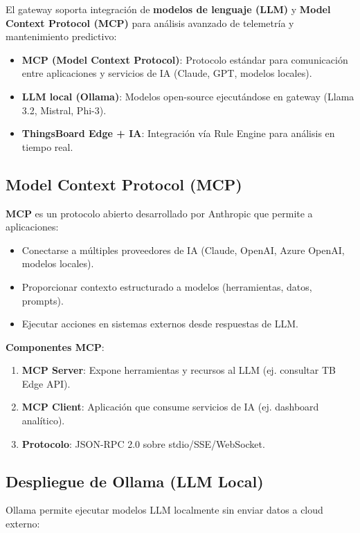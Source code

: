 El gateway soporta integración de \textbf{modelos de lenguaje (LLM)} y \textbf{Model Context Protocol (MCP)} para análisis avanzado de telemetría y mantenimiento predictivo:

\begin{itemize}
    \item \textbf{MCP (Model Context Protocol)}: Protocolo estándar para comunicación entre aplicaciones y servicios de IA (Claude, GPT, modelos locales).
    \item \textbf{LLM local (Ollama)}: Modelos open-source ejecutándose en gateway (Llama 3.2, Mistral, Phi-3).
    \item \textbf{ThingsBoard Edge + IA}: Integración vía Rule Engine para análisis en tiempo real.
\end{itemize}

\subsection{Model Context Protocol (MCP)}

\textbf{MCP} es un protocolo abierto desarrollado por Anthropic que permite a aplicaciones:
\begin{itemize}
    \item Conectarse a múltiples proveedores de IA (Claude, OpenAI, Azure OpenAI, modelos locales).
    \item Proporcionar contexto estructurado a modelos (herramientas, datos, prompts).
    \item Ejecutar acciones en sistemas externos desde respuestas de LLM.
\end{itemize}

\textbf{Componentes MCP}:
\begin{enumerate}
    \item \textbf{MCP Server}: Expone herramientas y recursos al LLM (ej. consultar TB Edge API).
    \item \textbf{MCP Client}: Aplicación que consume servicios de IA (ej. dashboard analítico).
    \item \textbf{Protocolo}: JSON-RPC 2.0 sobre stdio/SSE/WebSocket.
\end{enumerate}

\subsection{Despliegue de Ollama (LLM Local)}

Ollama permite ejecutar modelos LLM localmente sin enviar datos a cloud externo:


